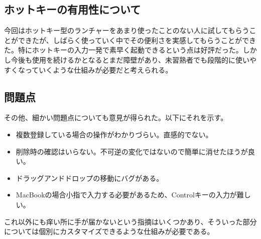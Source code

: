 \subsection{ホットキーの有用性について}
今回はホットキー型のランチャーをあまり使ったことのない人に試してもらうことができたが、しばらく使っていく中でその便利さを実感してもらうことができた。特にホットキーの入力一発で素早く起動できるという点は好評だった。しかし今後も使用を続けるかとなるとまだ障壁があり、未習熟者でも段階的に使いやすくなっていくような仕組みが必要だと考えられる。

\subsection{問題点}
その他、細かい問題点についても意見が得られた。以下にそれを示す。
\begin{itemize}
  \item 複数登録している場合の操作がわかりづらい。直感的でない。
  \item 削除時の確認はいらない。不可逆の変化ではないので簡単に消せたほうが良い。
  \item ドラッグアンドドロップの移動にバグがある。
  \item MacBookの場合小指で入力する必要があるため、Controlキーの入力が難しい。
\end{itemize}
これ以外にも痒い所に手が届かないという指摘はいくつかあり、そういった部分については個別にカスタマイズできるような仕組みが必要である。